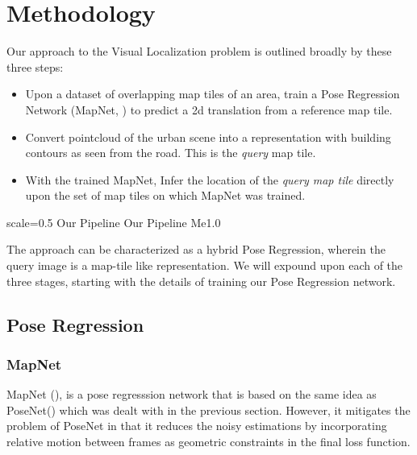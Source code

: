 
\chapter{Methodology}
\label{Methodology}
Our approach to the Visual Localization problem is outlined broadly by these three steps:

\begin{itemize}
	\item Upon a dataset of overlapping map tiles of an area, train a Pose Regression Network (MapNet, \cite{Brahmbhatt2018}) to predict a 2d translation from a reference map tile. \\
	
	\item Convert pointcloud of the urban scene into a representation with building contours as seen from the road. This is the \emph{query} map tile.\\
	
	\item With the trained MapNet, Infer the location of the \emph{query map tile} directly upon the set of map tiles on which MapNet was trained.\\  
\end{itemize}

{scale=0.5}%
{Our Pipeline}%
{Our Pipeline}%
{Me1.0} 

The approach can be characterized as a hybrid Pose Regression, wherein the query image is a map-tile like representation. We will expound upon each of the three stages, starting with the details of training our Pose Regression network.   

\section{Pose Regression}
\subsection{MapNet}
MapNet (\cite{Brahmbhatt2018}), is a pose regresssion network that is based on the same idea as PoseNet(\cite{Kendall2015}) which was dealt with in the previous section. However, it mitigates the problem of PoseNet in that it reduces the noisy estimations by incorporating relative motion between frames as geometric constraints in the final loss function. 

